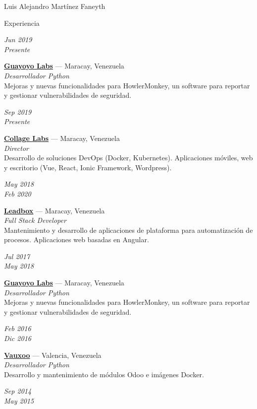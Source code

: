 \documentclass[10pt,letterpaper]{article}
\begin{document}
\begin{cv}{Luis Alejandro Mart\'inez Faneyth}
\begin{cvlist}{Experiencia}
	\item[{\parbox[t]{6em}{\textit{\large{Jun 2019\\Presente}}}}]{
		\parbox[t]{\linewidth}{
			\textbf{\href{https://guayoyolabs.com}{Guayoyo Labs}} --- Maracay, Venezuela\\
			\textit{Desarrollador Python}\\
			\footnotesize{Mejoras y nuevas funcionalidades para HowlerMonkey, un software para reportar y gestionar vulnerabilidades de seguridad.}
		}
	}
\item[{\parbox[t]{6em}{\textit{\large{Sep 2019\\Presente}}}}]{
	\parbox[t]{\linewidth}{
		\textbf{\href{http://collagelabs.org}{Collage Labs}} --- Maracay, Venezuela\\
		\textit{Director}\\
		\footnotesize{Desarrollo de soluciones DevOps (Docker, Kubernetes). Aplicaciones móviles, web y escritorio (Vue, React, Ionic Framework, Wordpress).}
	}
}
\item[{\parbox[t]{6em}{\textit{\large{May 2018\\Feb 2020}}}}]{
	\parbox[t]{\linewidth}{
		\textbf{\href{http://leadboxhq.com}{Leadbox}} --- Maracay, Venezuela\\
		\textit{Full Stack Developer}\\
		\footnotesize{Mantenimiento y desarrollo de aplicaciones de plataforma para automatización de procesos. Aplicaciones web basadas en Angular.}
	}
}
\item[{\parbox[t]{6em}{\textit{\large{Jul 2017\\May 2018}}}}]{
	\parbox[t]{\linewidth}{
		\textbf{\href{https://guayoyolabs.com}{Guayoyo Labs}} --- Maracay, Venezuela\\
		\textit{Desarrollador Python}\\
		\footnotesize{Mejoras y nuevas funcionalidades para HowlerMonkey, un software para reportar y gestionar vulnerabilidades de seguridad.}
	}
}
\item[{\parbox[t]{6em}{\textit{\large{Feb 2016\\Dic 2016}}}}]{
	\parbox[t]{\linewidth}{
		\textbf{\href{https://www.vauxoo.com}{Vauxoo}} --- Valencia, Venezuela\\
		\textit{Desarrollador Python}\\
		\footnotesize{Desarrollo y mantenimiento de m\'odulos Odoo e im\'agenes Docker.}
	}
}
\item[{\parbox[t]{6em}{\textit{\large{Sep 2014\\May 2015}}}}]{
}
\end{cvlist}
\end{cv}
\end{document}

